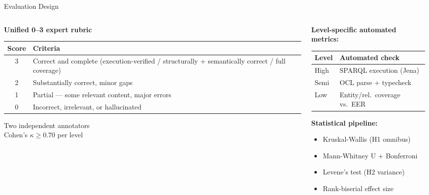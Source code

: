 \documentclass[aspectratio=169]{beamer}
\begin{document}
\begin{frame}{Evaluation Design}

\begin{columns}[T]
\begin{column}{0.48\textwidth}
\textbf{Unified 0--3 expert rubric}\\[0.3em]
{\small
\begin{tabular}{@{}cp{5.5cm}@{}}
\toprule
Score & Criteria \\
\midrule
3 & Correct and complete (execution-verified / structurally + semantically correct / full coverage) \\
2 & Substantially correct, minor gaps \\
1 & Partial --- some relevant content, major errors \\
0 & Incorrect, irrelevant, or hallucinated \\
\bottomrule
\end{tabular}
}

\vspace{0.5em}
{\small Two independent annotators\\Cohen's $\kappa \geq 0.70$ per level}
\end{column}

\begin{column}{0.48\textwidth}
\textbf{Level-specific automated metrics:}\\[0.3em]
{\small
\begin{tabular}{@{}ll@{}}
\toprule
Level & Automated check \\
\midrule
High & SPARQL execution (Jena) \\
Semi & OCL parse + typecheck \\
Low & Entity/rel.\ coverage vs.\ EER \\
\bottomrule
\end{tabular}
}

\vspace{0.8em}
\textbf{Statistical pipeline:}
\begin{itemize}\small
    \item Kruskal-Wallis (H1 omnibus)
    \item Mann-Whitney U + Bonferroni
    \item Levene's test (H2 variance)
    \item Rank-biserial effect size
\end{itemize}
\end{column}
\end{columns}

\end{frame}
\end{document}
